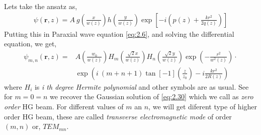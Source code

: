 \documentclass[11pt,a4paper]{article}
\numberwithin{equation}{section}
\begin{document}
Lets take the ansatz as,
\begin{align}
	\psi(\boldsymbol{r},z)= A \: g\left(\frac{x}{w(z)}\right) h\left(\frac{y}{w(z)}\right) \exp\left[-i\left(p(z) + \frac{kr^2}{2q(z)}\right)\right]
\end{align}
Putting this in Paraxial wave equation \ref{eq:2.6}, and solving the differential equation,\cite{milonni} we get,
\begin{align}
	\psi_{m,n}(\boldsymbol{r},z)=& A \left(\frac{w_0}{w(z)}\right) H_m\left(\frac{\sqrt{2} x}{w(z)}\right) H_n\left(\frac{\sqrt{2} y}{w(z)}\right)\exp( -\frac{r^2}{w^2(z)}) \cdot\nonumber\\ 
	&\exp( i\:(m+n+1)\tan[-1](\frac{z}{z_0}) -i\frac{kr^2}{2R(z)}) \label{eq:2.53}
\end{align}
where $H_i$ is \textit{i th degree Hermite polynomial} and other symbols are as usual.
See for $m=0=n$ we recover the Gaussian solution of \ref{eq:2.30} which we call as \textit{zero order} HG beam. For different values of $m$ an $n$, we will get diferent type of higher order HG beam, these are called \textit{transverse electromagnetic mode} of order $(m,n)$ or, $TEM_{mn}$. 
\end{document}
